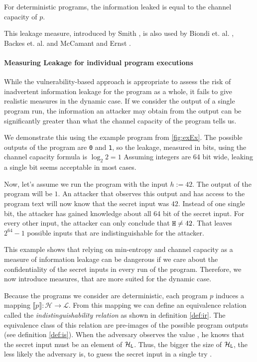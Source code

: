 \begin{theorem}
    For deterministic programs, the information leaked is equal to the channel capacity of $p$.
\end{theorem}

This leakage measure, introduced by Smith \cite{smith09}, is also used by Biondi et. al. \cite{biondi18}, Backes et. al. \cite{backes09} and McCamant and Ernst \cite{mccamant08}.

\paragraph{Measuring Leakage for individual program executions}
While the vulnerability-based approach is appropriate to assess the risk of inadvertent information leakage for the program as a whole, it fails to give realistic measures in the dynamic case. If we consider the output of a single program run, the information an attacker may obtain from the output can be significantly greater than what the channel capacity of the program tells us.

We demonstrate this using the example program from \ref{fig:exEx}. The possible outputs of the program are \texttt{0} and \texttt{1}, so the leakage, measured in bits, using the channel capacity formula is $\log_2 2 = 1$ Assuming integers are 64 bit wide, leaking a single bit seems acceptable in most cases.

Now, let's assume we run the program with the input $h := 42$. The output of the program will be $1$. An attacker that observes this output and has access to the program text will now know that the secret input was $42$. Instead of one single bit, the attacker has gained knowledge about all 64 bit of the secret input. For every other input, the attacker can only conclude that $\mathtt{H} \neq 42$. That leaves $2^{64} - 1$ possible inputs that are indistinguishable for the attacker. 

This example shows that relying on min-entropy and channel capacity as a measure of information leakage can be dangerous if we care about the confidentiality of the secret inputs in every run of the program. Therefore, we now introduce measures, that are more suited for the dynamic case.

Because the programs we consider are deterministic, each program $p$ induces a mapping $\llbracket p \rrbracket: \mathcal{H} \longrightarrow \mathcal{L}$. From this mapping we can define an equivalence relation called the \emph{indistinguishability relation} as shown in definition \ref{def:ir}. The equivalence class of this relation are pre-images of the possible program outputs (see definition \ref{def:is}). When the adversary observes the value \Out, he knows that the secret input must be an element of $\mathcal{H}_{\mathtt{L}}$. Thus, the bigger the size of $\mathcal{H}_{\mathtt{L}}$, the less likely the adversary is, to guess the secret input in a single try \cite{backes09, smith09, alvim19}. 


